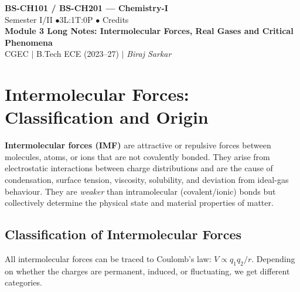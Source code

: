 \documentclass[12pt,a4paper]{article}
\begin{document}
\begin{center}
  {\LARGE\bfseries\color{myred} BS-CH101 / BS-CH201 --- Chemistry-I}\\[5pt]
  {\normalsize\color{mydark} Semester I/II \quad$\bullet$\quad 3L:1T:0P \quad$\bullet$ Credits}\\[3pt]
  {\normalsize\color{myteal}\textbf{Module 3 Long Notes: Intermolecular Forces, Real Gases and Critical Phenomena}}\\[3pt]
  {\small\color{mydark} CGEC \;$|$\; B.Tech ECE (2023--27) \;$|$\; \textit{Biraj Sarkar}}
\end{center}
\vspace{2pt}
\noindent{\color{myred}\rule{\linewidth}{1.5pt}}
\vspace{2pt}
\hypersetup{linkcolor=mydark}
\tableofcontents
\hypersetup{linkcolor=myteal}
\newpage
\section{Intermolecular Forces: Classification and Origin}

\begin{tcolorbox}[defbox]
\textbf{Intermolecular forces (IMF)} are attractive or repulsive forces between molecules, atoms, or ions that are not covalently bonded. They arise from electrostatic interactions between charge distributions and are the cause of condensation, surface tension, viscosity, solubility, and deviation from ideal-gas behaviour. They are \emph{weaker} than intramolecular (covalent/ionic) bonds but collectively determine the physical state and material properties of matter.
\end{tcolorbox}

\subsection{Classification of Intermolecular Forces}
All intermolecular forces can be traced to Coulomb's law: $V \propto q_1 q_2 / r$. Depending on whether the charges are permanent, induced, or fluctuating, we get different categories.
\end{document}
